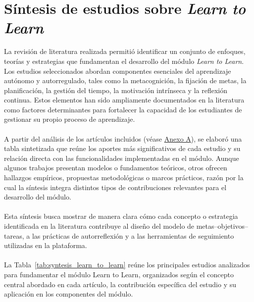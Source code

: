\section{Síntesis de estudios sobre \textit{Learn to Learn}}

La revisión de literatura realizada permitió identificar un conjunto de enfoques, teorías y estrategias que fundamentan el desarrollo del módulo \textit{Learn to Learn}. Los estudios seleccionados abordan componentes esenciales del aprendizaje autónomo y autorregulado, tales como la metacognición, la fijación de metas, la planificación, la gestión del tiempo, la motivación intrínseca y la reflexión continua. Estos elementos han sido ampliamente documentados en la literatura como factores determinantes para fortalecer la capacidad de los estudiantes de gestionar su propio proceso de aprendizaje.
\\
\\
A partir del análisis de los artículos incluidos (véase \hyperref[anexo:learn_to_learn]{Anexo A}), se elaboró una tabla sintetizada que reúne los aportes más significativos de cada estudio y su relación directa con las funcionalidades implementadas en el módulo. Aunque algunos trabajos presentan modelos o fundamentos teóricos, otros ofrecen hallazgos empíricos, propuestas metodológicas o marcos prácticos, razón por la cual la síntesis integra distintos tipos de contribuciones relevantes para el desarrollo del módulo.
\\
\\
Esta síntesis busca mostrar de manera clara cómo cada concepto o estrategia identificada en la literatura contribuye al diseño del modelo de metas--objetivos--tareas, a las prácticas de autorreflexión y a las herramientas de seguimiento utilizadas en la plataforma.
\\
\\
La Tabla~\ref{tab:syntesis_learn_to_learn} reúne los principales estudios analizados para fundamentar el módulo Learn to Learn, organizados según el concepto central abordado en cada artículo, la contribución específica del estudio y su aplicación en los componentes del módulo.

